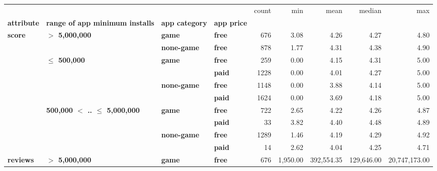 \begin{tabular}{llll|rrrrr}
\toprule
      &                                 &           &      &  count &      min &       mean &     median &           max \\
\textbf{attribute} & \textbf{range of app minimum installs} & \textbf{app category} & \textbf{app price} &        &          &            &            &               \\
\midrule
\multirow{10}{*}{\textbf{score}} & \multirow{2}{*}{\textbf{$>$ 5,000,000}} & \textbf{game} & \textbf{free} &    676 &     3.08 &       4.26 &       4.27 &          4.80 \\
      &                                 & \textbf{none-game} & \textbf{free} &    878 &     1.77 &       4.31 &       4.38 &          4.90 \\
\cline{2-9}
      & \multirow{4}{*}{\textbf{$\leq$ 500,000}} & \multirow{2}{*}{\textbf{game}} & \textbf{free} &    259 &     0.00 &       4.15 &       4.31 &          5.00 \\
      &                                 &           & \textbf{paid} &   1228 &     0.00 &       4.01 &       4.27 &          5.00 \\
\cline{3-9}
      &                                 & \multirow{2}{*}{\textbf{none-game}} & \textbf{free} &   1148 &     0.00 &       3.88 &       4.14 &          5.00 \\
      &                                 &           & \textbf{paid} &   1624 &     0.00 &       3.69 &       4.18 &          5.00 \\
\cline{2-9}
\cline{3-9}
      & \multirow{4}{*}{\textbf{500,000 $<$ .. $\leq$ 5,000,000}} & \multirow{2}{*}{\textbf{game}} & \textbf{free} &    722 &     2.65 &       4.22 &       4.26 &          4.87 \\
      &                                 &           & \textbf{paid} &     33 &     3.82 &       4.40 &       4.48 &          4.89 \\
\cline{3-9}
      &                                 & \multirow{2}{*}{\textbf{none-game}} & \textbf{free} &   1289 &     1.46 &       4.19 &       4.29 &          4.92 \\
      &                                 &           & \textbf{paid} &     14 &     2.62 &       4.04 &       4.25 &          4.71 \\
\cline{1-9}
\cline{2-9}
\cline{3-9}
\multirow{10}{*}{\textbf{reviews}} & \multirow{2}{*}{\textbf{$>$ 5,000,000}} & \textbf{game} & \textbf{free} &    676 & 1,950.00 & 392,554.35 & 129,646.00 & 20,747,173.00 \\

\end{tabular}
